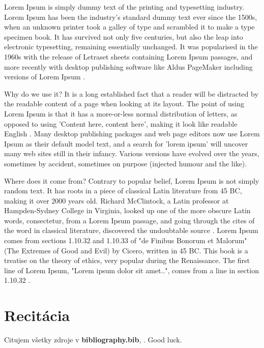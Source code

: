 Lorem Ipsum is simply dummy text of the printing and typesetting industry. Lorem Ipsum has been the industry's standard dummy text ever since the 1500s, when an unknown printer took a galley of type and scrambled it to make a type specimen book. It has survived not only five centuries, but also the leap into electronic typesetting, remaining essentially unchanged. It was popularised in the 1960s with the release of Letraset sheets containing Lorem Ipsum passages, and more recently with desktop publishing software like Aldus PageMaker including versions of Lorem Ipsum \cite{lipsum}.

Why do we use it? It is a long established fact that a reader will be distracted by the readable content of a page when looking at its layout. The point of using Lorem Ipsum is that it has a more-or-less normal distribution of letters, as opposed to using 'Content here, content here', making it look like readable English \cite{lipsum}. Many desktop publishing packages and web page editors now use Lorem Ipsum as their default model text, and a search for 'lorem ipsum' will uncover many web sites still in their infancy. Various versions have evolved over the years, sometimes by accident, sometimes on purpose (injected humour and the like).

Where does it come from? Contrary to popular belief, Lorem Ipsum is not simply random text. It has roots in a piece of classical Latin literature from 45 BC, making it over 2000 years old. Richard McClintock, a Latin professor at Hampden-Sydney College in Virginia, looked up one of the more obscure Latin words, consectetur, from a Lorem Ipsum passage, and going through the cites of the word in classical literature, discovered the undoubtable source \cite{lipsum}. Lorem Ipsum comes from sections 1.10.32 and 1.10.33 of "de Finibus Bonorum et Malorum" (The Extremes of Good and Evil) by Cicero, written in 45 BC. This book is a treatise on the theory of ethics, very popular during the Renaissance. The first line of Lorem Ipsum, "Lorem ipsum dolor sit amet..", comes from a line in section 1.10.32 \cite{lipsum}.

\section{Recitácia}
Citujem všetky zdroje v \textbf{bibliography.bib}, \cite{t00, t01, t02, t03, kniha, kniha2, kniha3, small, big, cs, koll, kap, tug, knuth, zbornik, prispevok}. \newline Good luck.

